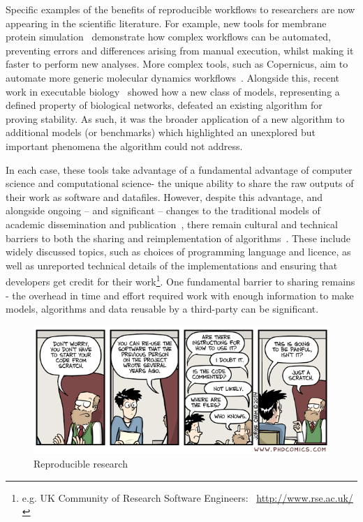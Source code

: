 \documentclass[conference]{IEEEtran}
\begin{document}
Specific examples of the benefits of reproducible workflows to researchers 
are now appearing in the scientific literature. For example, new tools for membrane protein 
simulation~\cite{Stansfeld,Hall2014}
demonstrate how complex workflows can be automated, preventing errors
and differences arising from manual execution, whilst making it faster
to perform new analyses. More complex tools, such as Copernicus, aim to 
automate more generic molecular dynamics workflows~\cite{Pronk}.
Alongside this, recent work in executable
biology~\cite{Cook} showed how a new class of models, representing a
defined property of biological networks, defeated an existing
algorithm for proving stability. As such, it was the broader
application of a new algorithm to additional models (or benchmarks)
which highlighted an unexplored but important phenomena the algorithm
could not address.

In each case, these tools take advantage of a fundamental advantage
of computer science and computational science- the unique ability to
share the raw outputs of their work as software and datafiles. However, 
despite this advantage, and alongside
ongoing -- and significant -- changes to the traditional models of
academic dissemination and
publication~\cite{deroure:2010,stodden-et-al:2013,fursin+dubach:2014},
there remain cultural and technical barriers to both the sharing and
reimplementation of algorithms~\cite{crick-et-al_wssspe2}. These
include widely discussed topics, such as choices of programming
language and licence, as well as unreported technical details of the
implementations and ensuring that developers get credit for their
work\footnote{e.g. UK Community of Research Software Engineers:
  ~\url{http://www.rse.ac.uk/}}. One fundamental barrier to sharing remains - 
	the overhead in time and effort required work with enough information to
	make models, algorithms and data reusable by a third-party can be significant.


\begin{figure}[!ht]
\centering
\includegraphics[width=\columnwidth]{phd031214s.png}
\caption{Reproducible research\newline [source: \url{http://www.phdcomics.com/comics.php?f=1689}]}
\label{fig:reprodres} 
\end{figure}
\end{document}
